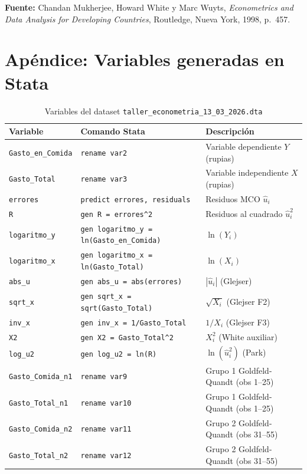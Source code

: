 \documentclass[12pt,a4paper]{article}
\begin{document}
\vspace{1em}
\noindent\textbf{Fuente:} Chandan Mukherjee, Howard White y Marc Wuyts,
\textit{Econometrics and Data Analysis for Developing Countries},
Routledge, Nueva York, 1998, p.~457.

\newpage
\appendix
\section{Apéndice: Variables generadas en Stata}

\begin{table}[H]
\centering
\caption{Variables del dataset \texttt{taller\_econometria\_13\_03\_2026.dta}}
\begin{tabular}{lll}
\toprule
\textbf{Variable} & \textbf{Comando Stata} & \textbf{Descripción}\\
\midrule
\texttt{Gasto\_en\_Comida} & \texttt{rename var2} & Variable dependiente $Y$ (rupias)\\
\texttt{Gasto\_Total}      & \texttt{rename var3} & Variable independiente $X$ (rupias)\\
\texttt{errores}           & \texttt{predict errores, residuals} & Residuos MCO $\hat{u}_i$\\
\texttt{R}                 & \texttt{gen R = errores\^{}2} & Residuos al cuadrado $\hat{u}_i^2$\\
\texttt{logaritmo\_y}      & \texttt{gen logaritmo\_y = ln(Gasto\_en\_Comida)} & $\ln(Y_i)$\\
\texttt{logaritmo\_x}      & \texttt{gen logaritmo\_x = ln(Gasto\_Total)} & $\ln(X_i)$\\
\texttt{abs\_u}            & \texttt{gen abs\_u = abs(errores)} & $|\hat{u}_i|$ (Glejser)\\
\texttt{sqrt\_x}           & \texttt{gen sqrt\_x = sqrt(Gasto\_Total)} & $\sqrt{X_i}$ (Glejser F2)\\
\texttt{inv\_x}            & \texttt{gen inv\_x = 1/Gasto\_Total} & $1/X_i$ (Glejser F3)\\
\texttt{X2}                & \texttt{gen X2 = Gasto\_Total\^{}2} & $X_i^2$ (White auxiliar)\\
\texttt{log\_u2}           & \texttt{gen log\_u2 = ln(R)} & $\ln(\hat{u}_i^2)$ (Park)\\
\texttt{Gasto\_Comida\_n1} & \texttt{rename var9} & Grupo 1 Goldfeld-Quandt (obs 1--25)\\
\texttt{Gasto\_Total\_n1}  & \texttt{rename var10} & Grupo 1 Goldfeld-Quandt (obs 1--25)\\
\texttt{Gasto\_Comida\_n2} & \texttt{rename var11} & Grupo 2 Goldfeld-Quandt (obs 31--55)\\
\texttt{Gasto\_Total\_n2}  & \texttt{rename var12} & Grupo 2 Goldfeld-Quandt (obs 31--55)\\
\bottomrule
\end{tabular}
\end{table}
\end{document}
